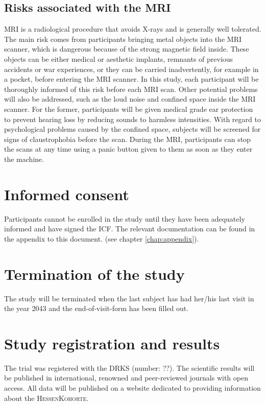 \subsection{Risks associated with the \ac{MRI}}
\ac{MRI} is a radiological procedure that avoids X-rays and is generally well tolerated. The main risk comes from participants bringing metal objects into the \ac{MRI} scanner, which is dangerous because of the strong magnetic field inside. These objects can be either medical or aesthetic implants, remnants of previous accidents or war experiences, or they can be carried inadvertently, for example in a pocket, before entering the \ac{MRI} scanner. In this study, each participant will be thoroughly informed of this risk before each \ac{MRI} scan. Other potential problems will also be addressed, such as the loud noise and confined space inside the \ac{MRI} scanner. For the former, participants will be given medical grade ear protection to prevent hearing loss by reducing sounds to harmless intensities. With regard to psychological problems caused by the confined space, subjects will be screened for signs of claustrophobia before the scan. During the \ac{MRI}, participants can stop the scans at any time using a panic button given to them as soon as they enter the machine.

\section{Informed consent}
Participants cannot be enrolled in the study until they have been adequately informed and have signed the \ac{ICF}. The relevant documentation can be found in the appendix to this document. (see chapter \ref{chap:appendix}).

\section{Termination of the study}
The study will be terminated when the last subject has had her/his last visit in the year 2043 and the end-of-visit-form has been filled out.

\section{Study registration and results}
The trial was registered with the \ac{DRKS} (number: ??). The scientific results will be published in international, renowned and peer-reviewed journals with open access. All data will be published on a website dedicated to providing information about the \textsc{HessenKohorte}.


